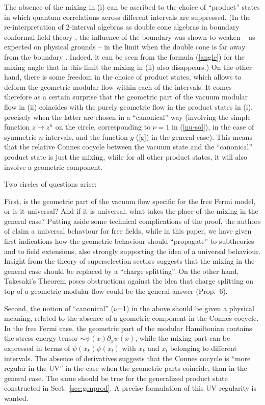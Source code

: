 \documentclass[12pt]{article}
\begin{document}
The absence of the mixing in (i) can be ascribed to the choice of
``product'' states in which quantum correlations across different
intervals are suppressed. (In the re-interpretation of 2-interval
algebras as double cone algebras in boundary conformal field theory
\cite{LR04}, the influence of the boundary was shown to weaken -- as
expected on physical grounds -- in the limit when the double cone is
far away from the boundary \cite{LR09}. Indeed, it can be seen from
the formula (\ref{angle}) for the mixing angle that in this limit the
mixing in (ii) also disappears.) On the other hand, there is some
freedom in the choice of product states, which allows to deform the
geometric modular flow within each of the intervals. It comes
therefore as a certain surprise that the geometric part of the vacuum
modular flow in (ii) coincides with the purely geometric flow in the
product states in (i), precisely when the latter are chosen in a
``canonical'' way (involving the simple function $z\mapsto z^n$ on the
circle, corresponding to $\nu=1$ in (\ref{nu-sol}), in the case of
symmetric  $n$-intervals, and the function $g$ (\ref{g}) in the
general case). This means that the relative Connes cocycle  between
the vacuum state and the ``canonical'' product state is just the
mixing, while for all other product states, it will also involve a
geometric component.   

Two circles of questions arise: 

First, is the geometric part of the
vacuum flow specific for the free Fermi model, or is it universal?
And if it is universal, what takes the place of the mixing in the
general case? Putting aside some technical complications of the proof,
the authors of \cite{CH} claim a universal behaviour for free
fields, while in this paper, we have given first indications how the
geometric behaviour should ``propagate'' to subtheories and to field
extensions, also strongly supporting the idea of a universal
behaviour. Insight from the theory of superselection sectors suggests
that the mixing in the general case should be replaced by a ``charge
splitting''. On the other hand, Takesaki's Theorem poses obstructions
against the idea that charge splitting on top of a geometric modular
flow could be the general answer (Prop.\ 6). 

Second, the notion of ``canonical'' ($\nu$=1) in the above should be
given a physical meaning, related to the absence of a geometric
component in the Connes cocycle. In the free Fermi case, the geometric
part of the modular Hamiltonian contains the stress-energy tensor 
$\sim\psi(x)\partial_x\psi(x)$, while the mixing part can be expressed
in terms of $\psi(x_k)\psi(x_l)$ with $x_k$ and $x_l$ belonging to
different intervals. The absence of derivatives suggests that the
Connes cocycle is ``more regular in the UV'' in the case when the
geometric parts coincide, than in the general case. The same should
be true for the generalized product state constructed in Sect.\
\ref{sec:genprod}. A precise formulation of this UV regularity is
wanted. 
\end{document}
